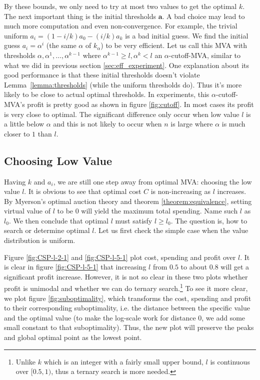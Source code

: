 By these bounds, we only need to try at most two values to get the optimal $k$.
The next important thing is the initial thresholds $\boldsymbol a$. A bad
choice may lead to much more computation and even non-convergence. For example,
the trivial uniform $a_i = (1-i/k)a_0 - (i/k) a_k$ is a bad initial guess. We
find the initial guess $a_i = \alpha^i$ (the same $\alpha$ of $k_\alpha$) to be
very efficient.  Let us call this MVA with thresholds $\alpha, \alpha^1,
\ldots, \alpha^{k-1}$ where $\alpha^{k-1} \geq l, \alpha^k < l$ an
$\alpha$-cutoff-MVA, similar to what we did in previous section
\ref{sec:eff_experiment}.  One explanation about its good performance is that
these initial thresholds doesn't violate Lemma~\ref{lemma:thresholds} (while
the uniform thresholds do). Thus it's more likely to be close to actual optimal
thresholds.
In experiments, this $\alpha$-cutoff-MVA's profit is pretty good as shown
in figure \ref{fig:cutoff}. In most cases its profit is very close to optimal.
The significant difference only occur when low value $l$ is a little below
$\alpha$ and this is not likely to occur when $n$ is large where $\alpha$ is
much closer to $1$ than $l$.

\subsection{Choosing Low Value}

Having $k$ and $a_i$, we are still one step away from optimal MVA: choosing the low
value $l$. It is obvious to see that optimal cost $C$ is non-increasing as $l$
increases. By Myerson's optimal auction theory and theorem
\ref{theorem:equivalence}, setting virtual value of $l$ to be $0$ will yield
the maximum total spending. Name such $l$ as $l_0$. We then conclude that
optimal $l$ must satisfy $l \geq l_0$. The
question is, how to search or determine optimal $l$. Let us first check the simple
case when the value distribution is uniform.

Figure \ref{fig:CSP-l-2-1} and \ref{fig:CSP-l-5-1} plot cost, spending and profit
over $l$. It is clear in figure \ref{fig:CSP-l-5-1} that increasing $l$ from $0.5$ to about $0.8$
will get a significant profit increase. However, it is not so clear in these two plots
whether profit is unimodal and whether we can do ternary search.\footnote{Unlike $k$ which is
an integer with a fairly small upper bound, $l$ is continuous over $[0.5, 1)$, 
thus a ternary search is more needed.}
To see it more clear, we plot figure \ref{fig:suboptimality},
which transforms the cost, spending and profit to their corresponding suboptimality, i.e.
the distance between the specific value and the optimal value (to make the log-scale work
for distance $0$, we add some small constant to that suboptimality). Thus, the new plot will
preserve the peaks and global optimal point as the lowest point.

